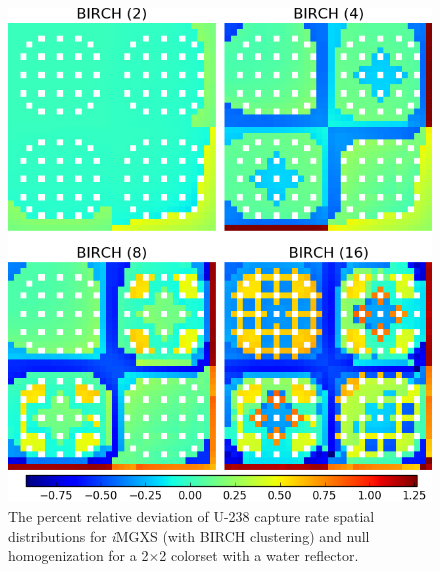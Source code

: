\begin{figure}[h!]
\centering
\includegraphics[width=0.9\linewidth]{figures/results/compare/reflector/compare-capt}
\vspace{2mm}
\caption[U-238 capture rate \textit{i}MGXS-to-null relative deviations]{The percent relative deviation of U-238 capture rate spatial distributions for \textit{i}\ac{MGXS} (with BIRCH clustering) and null homogenization for a 2$\times$2 colorset with a water reflector.}
\label{fig:chap11-refl-capt-rates-comp}
\end{figure}

\clearpage

